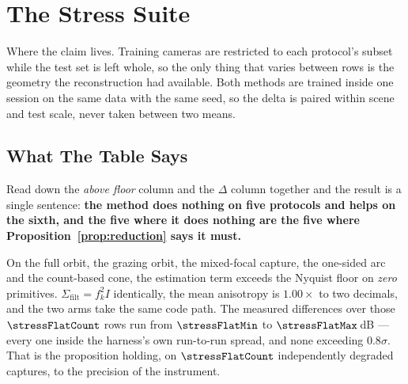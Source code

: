 \section{The Stress Suite}
\label{sec:table3}

Where the claim lives. Training cameras are restricted to each protocol's subset
while the test set is left whole, so the only thing that varies between rows is
the geometry the reconstruction had available. Both methods are trained inside
one session on the same data with the same seed, so the delta is paired within scene and test scale, never taken between two
means.




\subsection*{What The Table Says}

Read down the \emph{above floor} column and the $\Delta$ column together and the
result is a single sentence: \textbf{the method does nothing on five protocols
and helps on the sixth, and the five where it does nothing are the five where Proposition~\ref{prop:reduction} says it must.}

On the full orbit, the grazing orbit, the mixed-focal capture, the one-sided arc
and the count-based cone, the estimation term exceeds the Nyquist floor on
\emph{zero} primitives. $\Sigma_{\mathrm{filt}} = f_k^2 I$ identically, the mean
anisotropy is $1.00\times$ to two decimals, and the two arms take the same code
path. The measured differences over those $\stressFlatCount$ rows run from
$\stressFlatMin$ to $\stressFlatMax$\,dB --- every one inside the harness's own
run-to-run spread, and none
exceeding $0.8\sigma$. That is the proposition holding, on $\stressFlatCount$ independently degraded
captures, to the precision of the instrument.

